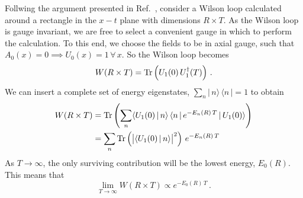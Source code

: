Follwing the argument presented in Ref.~\cite{Makeenko:2009dw}, consider a Wilson loop calculated around a rectangle in the $x-t$ plane with dimensions $R\times T$. As the Wilson loop is gauge invariant, we are free to select a convenient gauge in which to perform the calculation. To this end, we choose the fields to be in axial gauge, such that $A_0(x)=0\implies U_0(x) = 1\,\forall\,x$. So the Wilson loop becomes
%
\begin{equation}
W(R\times T) = \operatorname{Tr} \left(U_1(0)\,U_1^\dagger(T)\right)\, .
\end{equation}
%
We can insert a complete set of energy eigenstates, $\sum_n |\,n\rangle\,\langle n \,|=1$ to obtain
%
\begin{align*}
W(R\times T) &= \operatorname{Tr} \left( \sum_n \langle U_1(0)\, |\, n\rangle\,\langle n\, |\, e^{-E_n(R)\, T}\, | \, U_1(0) \rangle\right)\\
&=  \sum_n \operatorname{Tr} \left( \big|\langle U_1(0)\, |\, n\rangle\big|^2 \right)\,e^{-E_n(R)\,T} 
\end{align*}
%
As $T\rightarrow \infty$, the only surviving contribution will be the lowest energy, $E_0(R)$. This means that
%
\begin{equation}
\lim_{T\rightarrow \infty} W(R\times T) \propto e^{-E_0(R)\, T}\, .
\label{eq:WilsonEnergy}
\end{equation}
\\

